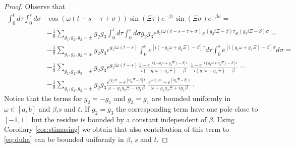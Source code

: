 \documentclass[10pt,a4paper]{amsart}
\newcommand{\dam}{\beta}
\begin{document}
\begin{proof} Observe that
\begin{equation}\label{eq:contr1}
\begin{aligned}
\int_0^td\tau\int_0^sd\sigma&
\cos(\omega(t-s-\tau+\sigma))
\sin(\Xi\tau)e^{-\dam \tau}\sin(\Xi\sigma)e^{-\dam \sigma}=\\
&-\frac 18\sum_{g_1,g_2,g_3=\pm}g_2g_3\int_0^td\tau\int_0^sd\sigma
g_2g_3e^{g_1i\omega(t-s-\tau+\sigma)}
e^{(g_2i\Xi-\dam)\tau}
e^{(g_3i\Xi-\dam)\sigma}=\\
&-\frac 18\sum_{g_1,g_2,g_3=\pm}g_2g_3e^{g_1i\omega(t-s)}
\int_0^t e^{[i(-g_1\omega+g_2\Xi)-\dam]\tau}d\tau
\int_0^s e^{[i(g_1\omega+g_3\Xi)-\dam]\sigma}d\sigma=\\
&-\frac 18\sum_{g_1,g_2,g_3=\pm}g_2g_3e^{g_1i\omega(t-s)}
\frac{1-e^{[i(-g_1\omega+g_2\Xi)-\dam]t}}
{i(-g_1\omega+g_2\Xi)-\dam}\;
\frac{1-e^{[i(g_1\omega+g_3\Xi)-\dam]s}}
{i(g_1\omega+g_3\Xi)-\dam}=\\
&-\frac 18\sum_{g_1,g_2,g_3=\pm}g_2g_3
\frac{e^{ig_1\omega t}-e^{[ig_2\Xi-\dam]t}}
{\omega-g_1g_2\Xi-ig_1\dam}\;
\frac{e^{-ig_1\omega s}-e^{[ig_3\Xi-\dam]s}}
{\omega+g_1g_3\Xi+ig_1\dam}\ .
\end{aligned}
\end{equation}
Notice that the terms for  $g_2=-g_1$ and $g_3=g_1$ are bounded
uniformly in $\omega\in[a,b]$ and $\dam$,$s$ and $t$. If $g_2=g_3$ the
corresponding term have one pole
close to $[-1,1]$ but the residue is 
bounded
by a constant independent of $\dam$. Using Corollary \ref{cor:stimasing} we obtain that also contribution of this
term to \eqref{eq:duha} can be bounded uniformly in $\dam$, $s$ and $t$. 


\end{proof}
\end{document}
